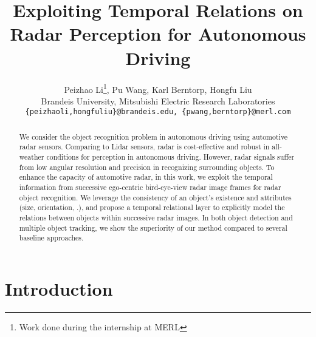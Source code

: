 \documentclass[10pt,twocolumn,letterpaper]{article}
\begin{document}
\title{Exploiting Temporal Relations on Radar Perception for Autonomous Driving}

\author{Peizhao Li\thanks{Work done during the internship at MERL}, Pu Wang, Karl Berntorp, Hongfu Liu\\
Brandeis University, Mitsubishi Electric Research Laboratories\\
{\tt\small \{peizhaoli,hongfuliu\}@brandeis.edu, \{pwang,berntorp\}@merl.com}
}
\maketitle

\begin{abstract}
We consider the object recognition problem in autonomous driving using automotive radar sensors. Comparing to Lidar sensors, radar is cost-effective and robust in all-weather conditions for perception in autonomous driving. However, radar signals suffer from low angular resolution and precision in recognizing surrounding objects. To enhance the capacity of automotive radar, in this work, we exploit the temporal information from successive ego-centric bird-eye-view radar image frames for radar object recognition. We leverage the consistency of an object's existence and attributes (size, orientation, \etc.), and propose a temporal relational layer to explicitly model the relations between objects within successive radar images. In both object detection and multiple object tracking, we show the superiority of our method compared to several baseline approaches.
\end{abstract}

\vspace{-5mm}
\section{Introduction}
\label{sec:intro}
\end{document}
